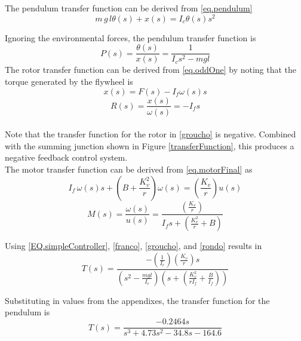 \documentclass[12pt,letterpaper]{article}
\begin{document}
The pendulum transfer function can be derived from \eqref{eq.pendulum}
%
\begin{equation}
    m \,g \,l \theta(s) + x(s) = I_{c}\theta(s) s^{2}
\end{equation}

Ignoring the environmental forces, the pendulum transfer function is 
\begin{equation}
    P(s) = \frac{\theta(s)}{x(s)}= \frac{1}{I_{c} s^{2} - m g l }
    \label{franco}
\end{equation}
%
The rotor transfer function can be derived from \eqref{eq.oddOne} by noting that the torque generated by the flywheel is
\begin{equation}
    x(s) = F(s) - I_{f}\omega(s) s
\end{equation}
%
\begin{equation}
    R(s) = \frac{x(s)}{\omega(s)} = -I_{f} s
    \label{groucho}
\end{equation}\\

Note that the transfer function for the rotor in \eqref{groucho} is negative.  Combined with the summing
junction shown in Figure \ref{transferFunction}, this produces a negative feedback control system.\\
 


The motor transfer function can be derived from \eqref{eq.motorFinal} as
\begin{equation}
    I_{f} \, \omega(s) s + \left( B+\frac{K_{v}^2}{r} \right) \omega(s) = \left(\frac{K_{v}} {r}\right)u(s)
\end{equation}
%
\begin{equation}
    M(s) = \frac{\omega(s)}{u(s)} =  \frac{\left(\frac{K_{v}} {r}\right)}{I_{f} s + (\frac{K_{v}^2}{r}+B)}
    \label{rondo}
\end{equation} 

Using \eqref{EQ.simpleController}, \eqref{franco}, \eqref{groucho}, and \eqref{rondo} results in 
%
\begin{equation}
	T(s) =\frac{-(\frac{1} {I_{c}})(\frac{K_{v}}{r})s}
	{(s^2-\frac{m g l}{I_{c}})(s+(\frac{K_{v}^2}{r I_{f}}+\frac{B}{I_{f}}))}
\end{equation}

Substituting in values from the appendixes, the transfer function for the pendulum is
\begin{equation}
	T(s) =\frac{-0.2464 s}{s^3 + 4.73 s^2 -34.8 s -164.6}
\end{equation}
\end{document}
